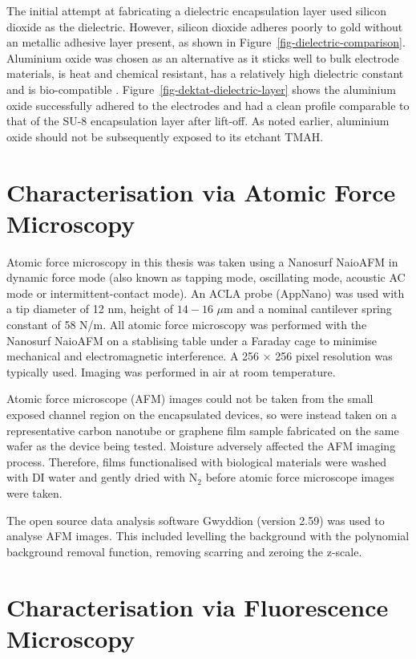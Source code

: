 \documentclass[
  a4paper,
]{scrbook}
\begin{document}
The initial attempt at fabricating a dielectric encapsulation layer used
silicon dioxide as the dielectric. However, silicon dioxide adheres
poorly to gold without an metallic adhesive layer present, as shown in
Figure~\ref{fig-dielectric-comparison}. Aluminium oxide was chosen as an
alternative as it sticks well to bulk electrode materials, is heat and
chemical resistant, has a relatively high dielectric constant and is
bio-compatible \autocite{Guarnieri2014,Albarghouthi2022,Kolodzey2000}.
Figure~\ref{fig-dektat-dielectric-layer} shows the aluminium oxide
successfully adhered to the electrodes and had a clean profile
comparable to that of the SU-8 encapsulation layer after lift-off. As
noted earlier, aluminium oxide should not be subsequently exposed to its
etchant TMAH.

\hypertarget{sec-afm-characterisation}{%
\section{Characterisation via Atomic Force
Microscopy}\label{sec-afm-characterisation}}

Atomic force microscopy in this thesis was taken using a Nanosurf
NaioAFM in dynamic force mode (also known as tapping mode, oscillating
mode, acoustic AC mode or intermittent-contact mode). An ACLA probe
(AppNano) was used with a tip diameter of 12 nm, height of \(14-16\)
\(\mu\)m and a nominal cantilever spring constant of 58 N/m. All atomic
force microscopy was performed with the Nanosurf NaioAFM on a stablising
table under a Faraday cage to minimise mechanical and electromagnetic
interference. A 256 \(\times\) 256 pixel resolution was typically used.
Imaging was performed in air at room temperature.

Atomic force microscope (AFM) images could not be taken from the small
exposed channel region on the encapsulated devices, so were instead
taken on a representative carbon nanotube or graphene film sample
fabricated on the same wafer as the device being tested. Moisture
adversely affected the AFM imaging process. Therefore, films
functionalised with biological materials were washed with DI water and
gently dried with N\(_2\) before atomic force microscope images were
taken.

The open source data analysis software Gwyddion (version 2.59) was used
to analyse AFM images. This included levelling the background with the
polynomial background removal function, removing scarring and zeroing
the z-scale.

\hypertarget{sec-fluorescence-characterisation}{%
\section{Characterisation via Fluorescence
Microscopy}\label{sec-fluorescence-characterisation}}
\end{document}
